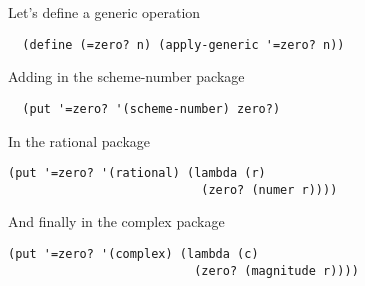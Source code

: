 \documentclass[a4paper,12pt]{article}
\begin{document}
Let's define a generic operation
\begin{lstlisting}
  (define (=zero? n) (apply-generic '=zero? n))
\end{lstlisting}
Adding in the scheme-number package
\begin{lstlisting}
  (put '=zero? '(scheme-number) zero?)
\end{lstlisting}
In the rational package
\begin{lstlisting}
(put '=zero? '(rational) (lambda (r)
                           (zero? (numer r))))
\end{lstlisting}
And finally in the complex package
\begin{lstlisting}
(put '=zero? '(complex) (lambda (c)
                          (zero? (magnitude r))))
\end{lstlisting}
\end{document}
